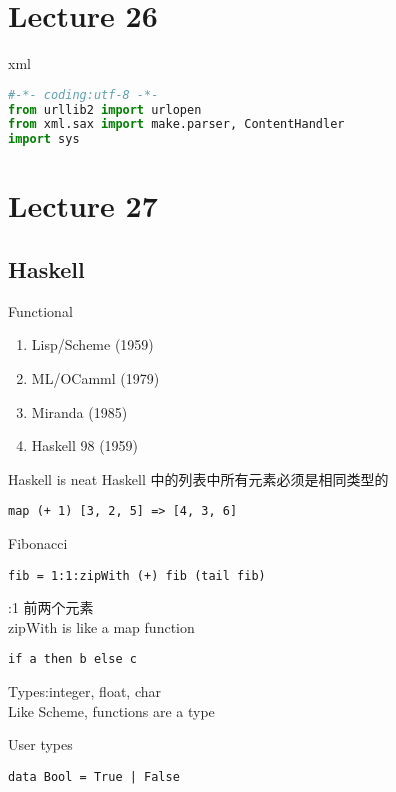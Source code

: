\documentclass{article}
\begin{document}
\section{Lecture 26}
xml

\begin{lstlisting}[language = Python]
#-*- coding:utf-8 -*-
from urllib2 import urlopen
from xml.sax import make.parser, ContentHandler
import sys
\end{lstlisting}

\section{Lecture 27}
\subsection{Haskell}
Functional
\begin{enumerate}
	\item Lisp/Scheme (1959)
	\item ML/OCamml (1979)
	\item Miranda (1985)
	\item Haskell 98 (1959)
\end{enumerate}
Haskell is neat
Haskell 中的列表中所有元素必须是相同类型的
\begin{verbatim}
map (+ 1) [3, 2, 5] => [4, 3, 6]
\end{verbatim}

Fibonacci
\begin{verbatim}
fib = 1:1:zipWith (+) fib (tail fib)
\end{verbatim}

\bigskip{}:1 前两个元素\\
zipWith is like a map function

\begin{verbatim}
if a then b else c
\end{verbatim}

\bigskip\noindent
Types:integer, float, char\\
Like Scheme, functions are a type

User types
\begin{verbatim}
data Bool = True | False
\end{verbatim}
\end{document}
